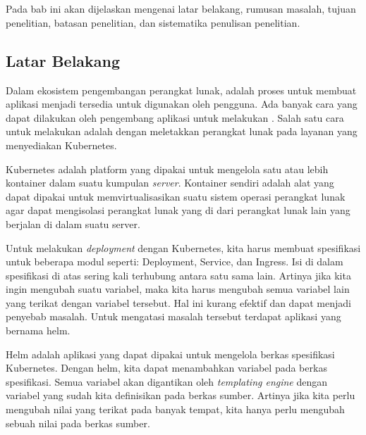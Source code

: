\chapter{\babSatu}
\label{bab:1}
Pada bab ini akan dijelaskan mengenai latar belakang, rumusan masalah, tujuan penelitian, batasan penelitian, dan sistematika penulisan penelitian.


\section{Latar Belakang}
\label{sec:latarBelakang}
Dalam ekosistem pengembangan perangkat lunak, \deployment adalah proses untuk membuat aplikasi menjadi tersedia untuk digunakan oleh pengguna. Ada banyak cara yang dapat dilakukan oleh pengembang aplikasi untuk melakukan \deploymentdot. Salah satu cara untuk melakukan \deployment adalah dengan meletakkan perangkat lunak pada layanan yang menyediakan Kubernetes. 

Kubernetes adalah platform yang dipakai untuk mengelola satu atau lebih kontainer dalam suatu kumpulan \textit{server}. Kontainer sendiri adalah alat yang dapat dipakai untuk memvirtualisasikan suatu sistem operasi perangkat lunak agar dapat mengisolasi perangkat lunak yang di \deploy dari perangkat lunak lain yang berjalan di dalam suatu server.

Untuk melakukan \textit{deployment} dengan Kubernetes, kita harus membuat spesifikasi untuk beberapa modul seperti: Deployment, Service, dan Ingress. Isi di dalam spesifikasi di atas sering kali terhubung antara satu sama lain. Artinya jika kita ingin mengubah suatu variabel, maka kita harus mengubah semua variabel lain yang terikat dengan variabel tersebut. Hal ini kurang efektif dan dapat menjadi penyebab masalah. Untuk mengatasi masalah tersebut terdapat aplikasi yang bernama helm.

Helm adalah aplikasi yang dapat dipakai untuk mengelola berkas spesifikasi Kubernetes. Dengan helm, kita dapat menambahkan variabel pada berkas spesifikasi. Semua variabel akan digantikan oleh \textit{templating engine} dengan variabel yang sudah kita definisikan pada berkas sumber. Artinya jika kita perlu mengubah nilai yang terikat pada banyak tempat, kita hanya perlu mengubah sebuah nilai pada berkas sumber.

